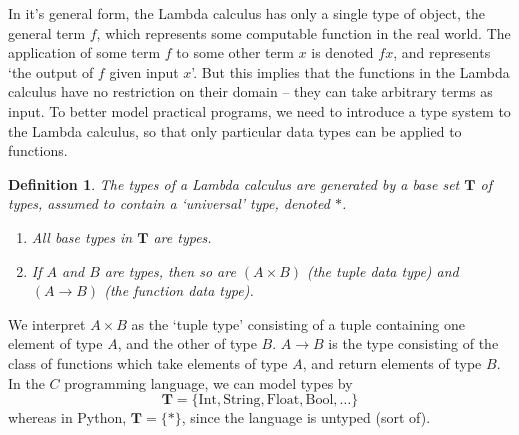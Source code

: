 \documentclass{article}
\theoremstyle{plain}
\newtheorem{definition}{Definition}
\begin{document}
In it's general form, the Lambda calculus has only a single type of object, the general term $f$, which represents some computable function in the real world. The application of some term $f$ to some other term $x$ is denoted $fx$, and represents `the output of $f$ given input $x$'. But this implies that the functions in the Lambda calculus have no restriction on their domain -- they can take arbitrary terms as input. To better model practical programs, we need to introduce a type system to the Lambda calculus, so that only particular data types can be applied to functions.

\begin{definition}
    The types of a Lambda calculus are generated by a base set $\mathbf{T}$ of types, assumed to contain a `universal' type, denoted $*$.
    \begin{enumerate}
        \item All base types in $\mathbf{T}$ are types.
        \item If $A$ and $B$ are types, then so are $(A \times B)$ (the tuple data type) and $(A \rightarrow B)$ (the function data type).
    \end{enumerate}
\end{definition}

We interpret $A \times B$ as the `tuple type' consisting of a tuple containing one element of type $A$, and the other of type $B$. $A \rightarrow B$ is the type consisting of the class of functions which take elements of type $A$, and return elements of type $B$. In the $C$ programming language, we can model types by
%
\[ \mathbf{T} = \{ \text{Int}, \text{String}, \text{Float}, \text{Bool}, \dots \} \]
%
whereas in Python, $\mathbf{T} = \{ * \}$, since the language is untyped (sort of).
\end{document}
